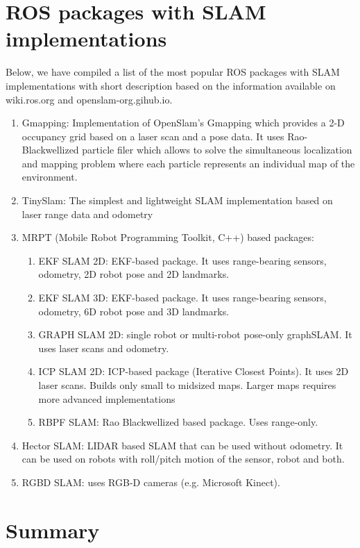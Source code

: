 \documentclass[twoside]{article}
\begin{document}
\section{ROS packages with SLAM implementations}
Below, we have compiled a list of the most popular ROS packages with SLAM implementations with short description based on the information available on wiki.ros.org and openslam-org.gihub.io.
\begin{enumerate}
    \item Gmapping: Implementation of OpenSlam's Gmapping which provides a 2-D occupancy grid based on a laser scan and a pose data. It uses Rao-Blackwellized particle filer which allows to solve the simultaneous localization and mapping problem where each particle represents an individual map of the environment.
    \item TinySlam: The simplest and lightweight SLAM implementation based on laser range data and odometry
    \item MRPT (Mobile Robot Programming Toolkit, C++) based packages:
    \begin{enumerate}
        \item EKF SLAM 2D: EKF-based package. It uses range-bearing sensors, odometry, 2D robot pose and 2D landmarks.
        \item EKF SLAM 3D: EKF-based package. It uses range-bearing sensors, odometry, 6D robot pose and 3D landmarks.
        \item GRAPH SLAM 2D: single robot or multi-robot pose-only graphSLAM. It uses laser scans and odometry.
        \item ICP SLAM 2D: ICP-based package (Iterative Closest Points). It uses 2D laser scans. Builds only small to midsized maps. Larger maps requires more advanced implementations
        \item RBPF SLAM: Rao Blackwellized based package. Uses range-only.
    \end{enumerate}
    \item Hector SLAM: LIDAR based SLAM that can be used without odometry. It can be used on robots with roll/pitch motion of the sensor, robot and both.
    \item RGBD SLAM: uses RGB-D cameras (e.g. Microsoft Kinect).
\end{enumerate}


\section {Summary}
\end{document}
